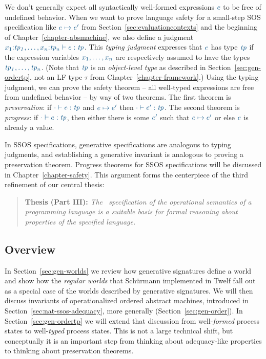 We don't generally expect all syntactically well-formed expressions
$\obj{e}$ to be free of undefined behavior. When we want to prove
language safety for a small-step SOS specification like $\obj{e
  \mapsto e'}$ from Section~\ref{sec:evaluationcontexts} and the
beginning of Chapter~\ref{chapter-absmachine}, we also define a
judgment $\obj{x_1{:}{\it tp_1},\ldots, x_n{:}{\it tp_n} \vdash e :
  {\it tp}}$.  This {\it typing judgment} expresses that $\obj{e}$ has
type $\obj{\it tp}$ if the expression variables $\obj{x_1, \ldots,
  x_n}$ are respectively assumed to have the types $\obj{\it tp_1,
  \ldots, tp_n}$. (Note that $\obj{\it tp}$ is an {\it object-level
  type} as described in Section~\ref{sec:gen-ordertp}, not an LF type
$\tau$ from Chapter~\ref{chapter-framework}.) Using the typing
judgment, we can prove the safety theorem -- all well-typed
expressions are free from undefined behavior -- by way of two
theorems. The first theorem is {\it preservation}: if $\obj{\cdot
  \vdash e : {\it tp}}$ and $\obj{e \mapsto e'}$ then $\obj{\cdot
  \vdash e' : {\it tp}}$. The second theorem is {\it progress}: if
$\obj{\cdot \vdash e : {\it tp}}$, then either there is some
$\obj{e'}$ such that $\obj{e \mapsto e'}$ or else $\obj{e}$ is already
a value.

In SSOS specifications, generative specifications are analogous to
typing judgments, and establishing a generative invariant is analogous
to proving a preservation theorem. Progress theorems for SSOS
specifications will be discussed in Chapter~\ref{chapter-safety}.
This argument forms the centerpiece of the third refinement of our
central thesis:

\smallskip
\begin{quote} 
  {\bf Thesis (Part III):} {\it The \sls~specification of the operational
    semantics of a programming language is a suitable basis for formal
    reasoning about properties of the specified language.}
\end{quote} 


\subsection*{Overview}

In Section~\ref{sec:gen-worlds} we review how generative signatures
define a world and show how the {\it regular worlds} that Sch\"urmann
implemented in Twelf \cite{schurmann00automating} fall out as a
special case of the worlds described by generative signatures.  We
will then discuss invariants of operationalized ordered abstract
machines, introduced in Section~\ref{sec:nat-ssos-adequacy}, more
generally (Section~\ref{sec:gen-order}). In
Section~\ref{sec:gen-ordertp} we will extend that discussion from
well-{\it formed} process states to well-{\it typed} process states.
This is not a large technical shift, but conceptually it is an
important step from thinking about adequacy-like properties to
thinking about preservation theorems. 

